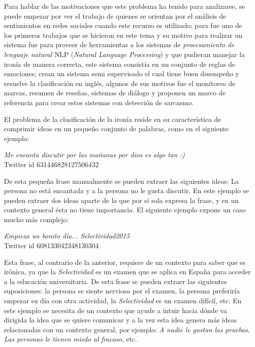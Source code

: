 \par Para hablar de las motivaciones que este problema ha tenido para analizarse, se puede empezar por ver el trabajo de \textcite{maynard2014cares} quienes se orientan por el análisis de sentimientos en redes sociales cuando este recurso es utilizado; para \textcite{utsumi1995interpret} fue uno de los primeros trabajos que se hicieron en este tema y su motivo para realizar un sistema fue para proveer de herramientas a los sistemas de \textit{procesamiento de lenguaje natural} NLP (\textit{Natural Language Processing}) y que pudieran manejar la ironía de manera correcta, este sistema consistía en un conjunto de reglas de emociones; \textcite{davidov2010semi} crean un sistema semi supervisado el cual tiene buen desempeño y resuelve la clasificación en inglés, algunos de sus motivos fue el monitoreo de marcas, resumen de reseñas, sistemas de diálogo y proponen un marco de referencia para crear estos sistemas con detección de sarcasmo.

\par El problema de la clasificación de la ironía reside en su característica de comprimir ideas en un pequeño conjunto de palabras, como en el siguiente ejemplo:

\begin{center}
	\textit{Me encanta discutir por las mañanas por dios es algo tan :)}\\[6pt]
	\footnotesize{Twitter id 631446828127506432}
\end{center}


\par De esta pequeña frase manualmente se pueden extraer las siguientes ideas: La persona no está encantada y a la persona no le gusta discutir. En este ejemplo se pueden extraer dos ideas aparte de la que por sí sola expresa la frase, y en un contexto general ésta no tiene importancia. El siguiente ejemplo expone un caso mucho más complejo:

\begin{center}
	\textit{Empieza un bonito día...  Selectividad2015}\\[6pt]
	\footnotesize{Twitter id 608133042348130304}
\end{center}


\par Esta frase, al contrario de la anterior, requiere de un contexto para saber que es irónica, ya que la \textit{Selectividad} es un examen que se aplica en España para acceder a la educación universitaria. De esta frase se pueden extraer las siguientes suposiciones: la persona se siente nerviosa por el examen, la persona preferiría empezar su día con otra actividad, la \textit{Selectividad} es un examen difícil, etc. En este ejemplo se necesita de un contexto que ayude a intuir hacia dónde va dirigida la idea que se quiere comunicar y a la vez esta idea genera más ideas relacionadas con un contexto general, por ejemplo: \textit{A nadie le gustan las pruebas}, \textit{Las personas le tienen miedo al fracaso}, etc.

